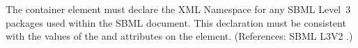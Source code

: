 The  container element must declare the XML Namespace for any
SBML Level~3 packages used within the SBML document.  This declaration must
be consistent with the values of the  and 
attributes on the  element.  (References: SBML L3V2
.)

